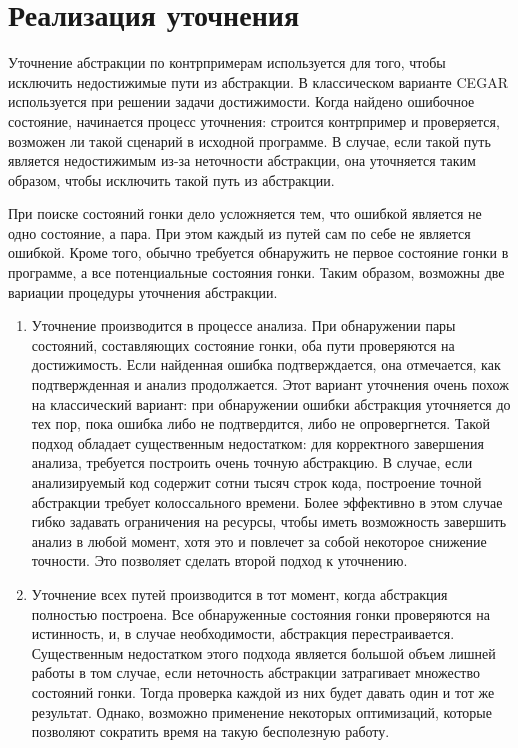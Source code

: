 \section{Реализация уточнения} \label{sect_impl_refinement}

Уточнение абстракции по контрпримерам используется для того, чтобы исключить недостижимые пути из абстракции.
В классическом варианте CEGAR используется при решении задачи достижимости.
Когда найдено ошибочное состояние, начинается процесс уточнения: строится контрпример и проверяется, возможен ли такой сценарий в исходной программе. В случае, если такой путь является недостижимым из-за неточности абстракции, она уточняется таким образом, чтобы исключить такой путь из абстракции. 

При поиске состояний гонки дело усложняется тем, что ошибкой является не одно состояние, а пара. При этом каждый из путей сам по себе не является ошибкой.
Кроме того, обычно требуется обнаружить не первое состояние гонки в программе, а все потенциальные состояния гонки. 
Таким образом, возможны две вариации процедуры уточнения абстракции.

\begin{enumerate}
\item Уточнение производится в процессе анализа. При обнаружении пары состояний, составляющих состояние гонки, оба пути проверяются на достижимость. Если найденная ошибка подтверждается, она отмечается, как подтвержденная и анализ продолжается.
Этот вариант уточнения очень похож на классический вариант: при обнаружении ошибки абстракция уточняется до тех пор, пока ошибка либо не подтвердится, либо не опровергнется.
Такой подход обладает существенным недостатком: для корректного завершения анализа, требуется построить очень точную абстракцию. 
В случае, если анализируемый код содержит сотни тысяч строк кода, построение точной абстракции требует колоссального времени. 
Более эффективно в этом случае гибко задавать ограничения на ресурсы, чтобы иметь возможность завершить анализ в любой момент, хотя это и повлечет за собой некоторое снижение точности. 
Это позволяет сделать второй подход к уточнению.

\item Уточнение всех путей производится в тот момент, когда абстракция полностью построена. Все обнаруженные состояния гонки проверяются на истинность, и, в случае необходимости, абстракция перестраивается. 
Существенным недостатком этого подхода является большой объем лишней работы в том случае, если неточность абстракции затрагивает множество состояний гонки.
Тогда проверка каждой из них будет давать один и тот же результат.
Однако, возможно применение некоторых оптимизаций, которые позволяют сократить время на такую бесполезную работу. 
\end{enumerate}

